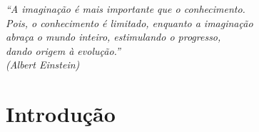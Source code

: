 \documentclass[
	12pt,				%
	openright,			%
	oneside,
	a4paper,			%
	english,			%
	french,				%
	spanish,			%
	brazil				%
	]{abntex2}
\begin{document}
\frenchspacing 


\imprimircapa
\imprimirfolhaderosto









\begin{epigrafe}
    \vspace*{\fill}
	\begin{flushright}
		\textit{``A imaginação é mais importante que o conhecimento. \\
		        Pois, o conhecimento é limitado, enquanto a imaginação \\
		        abraça o mundo inteiro, estimulando o progresso, \\
		        dando origem à evolução.''\\
		(Albert Einstein)}
	\end{flushright}
\end{epigrafe}






\renewcommand{\listingscaption}{Algoritmo}
\renewcommand{\listoflistingscaption}{Lista de Códigos Fonte}
\listoflistings
\cleardoublepage

\listoffigures*
\cleardoublepage

\listoftables*
\cleardoublepage



%

{
  \hypersetup{linkcolor=black}
  \tableofcontents*
}
\cleardoublepage

\part{Introdução}
\end{document}
